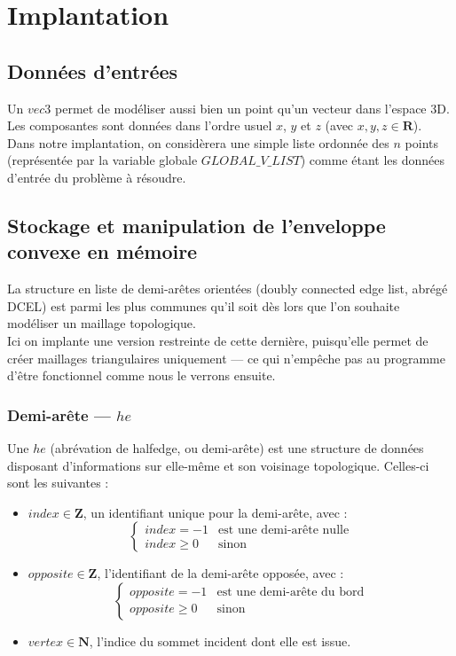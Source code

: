 \documentclass[]{article}
\begin{document}
\section{Implantation}

\subsection{Données d'entrées}
Un $vec3$ permet de modéliser aussi bien un point qu'un vecteur dans l'espace 3D. Les composantes sont données dans l'ordre usuel $x$, $y$ et $z$ (avec $x, y, z \in \mathbf{R}$).\\
Dans notre implantation, on considèrera une simple liste ordonnée des $n$ points (représentée par la variable globale $GLOBAL\_V\_LIST$) comme étant les données d'entrée du problème à résoudre.

\subsection{Stockage et manipulation de l'enveloppe convexe en mémoire}
La structure en liste de demi-arêtes orientées (doubly connected edge list, abrégé DCEL) est parmi les plus communes qu'il soit dès lors que l'on souhaite modéliser un maillage topologique.\\
Ici on implante une version restreinte de cette dernière, puisqu'elle permet de créer maillages triangulaires uniquement — ce qui n'empêche pas au programme d'être fonctionnel comme nous le verrons ensuite.

\subsubsection*{Demi-arête — $he$}
Une $he$ (abrévation de halfedge, ou demi-arête) est une structure de données disposant d'informations sur elle-même et son voisinage topologique. Celles-ci sont les suivantes :
\begin{itemize}
	\item $index \in \mathbf{Z}$, un identifiant unique pour la demi-arête, avec :
	      \[
		      \left\{
		      \begin{array}{ll}
			      index = -1   & \mbox{est une demi-arête nulle} \\
			      index \geq 0 & \mbox{sinon}
		      \end{array}
		      \right.
	      \]
	\item $opposite \in \mathbf{Z}$, l'identifiant de la demi-arête opposée, avec :
	      \[
		      \left\{
		      \begin{array}{ll}
			      opposite = -1   & \text{est une demi-arête du bord} \\
			      opposite \geq 0 & \text{sinon}
		      \end{array}
		      \right.
	      \]
	\item $vertex \in \mathbf{N}$, l'indice du sommet incident dont elle est issue.
\end{itemize}
\end{document}
